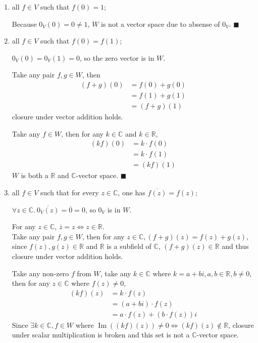 \documentclass{article}
\theoremstyle{definition}
\numberwithin{equation}{problem}
\newcommand{\R}{\mathbb{R}}
\newcommand{\C}{\mathbb{C}}
\renewcommand{\vec}[1]{\mathit{#1}_V}
\newcommand{\conj}[1]{\overline{#1}}
\begin{document}
\begin{enumerate}[label=(\roman*)]
    \item all $f\in V$ such that $f(0) = 1$;

        Because $\vec{0}(0) = 0 \ne 1$, $W$ is not a vector space due to absense of $\vec{0}$.
        \hfill$\blacksquare$
    \item all $f\in V$ such that $f(0) = f(1)$;

        $\vec{0}(0) = \vec{0}(1) = 0$, so the zero vector is in $W$.

        Take any pair $f,g \in W$, then
        \begin{align*}
            (f+g)(0) &= f(0) + g(0) \\
            &= f(1) + g(1)  \\
            &= (f+g)(1)
        \end{align*}
        closure under vector addition holds.

        Take any $f \in W$, then for any $k\in\C$ and $k \in\R$,
        \begin{align*}
            (kf)(0) &= k\cdot f(0)  \\
            &= k\cdot f(1)  \\
            &= (kf)(1)
        \end{align*}
        $W$ is both a $\R$ and $\C$-vector space.
        \hfill$\blacksquare$
    \item all $f\in V$ such that for every $z\in \C$, one has $\conj{f(z)} = f(z)$;

        $\forall z\in \C.~ \conj{\vec{0}(z)} = \conj{0} = 0$, so $\vec{0}$ is in $W$.

        For any $z\in \C$, $\conj{z} = z \iff z \in \R$.\\
        Take any pair $f,g \in W$,
        then for any $z\in\C, (f+g)(z) = f(z) + g(z)$,
        since $f(z), g(z) \in \R$ and $\R$ is a subfield of $\C$,
        $(f+g)(z) \in \R$ and thus closure under vector addition holds.

        Take any non-zero $f$ from $W$, take any $k\in \C$ where $k = a + bi, a,b\in \R, b\ne 0$,
        then for any $z\in \C$ where $f(z) \ne 0$,
        \begin{align*}
            (kf)(z) &= k\cdot f(z) \\
            &= (a+bi)\cdot f(z) \\
            &= a\cdot f(z) + (b\cdot f(z))i
        \end{align*}
        Since $\exists k\in \C, f\in W$ where $\operatorname{Im}((kf)(z)) \ne 0 \iff (kf)(z)\not\in \R$,
        closure under scalar multiplication is broken and this set is not a $\C$-vector space.


\end{enumerate}
\end{document}
